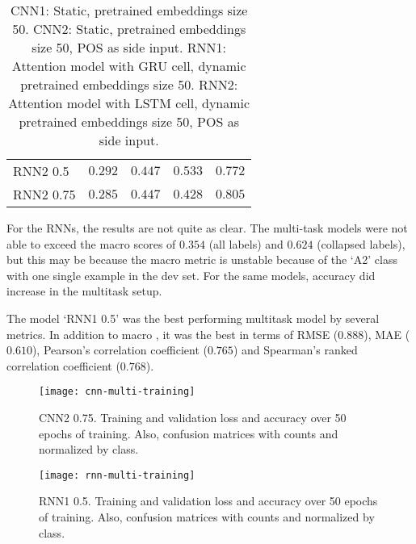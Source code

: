 \begin{table}
\begin{tabular}{lrrrr}
    RNN2 0.5  &         $0.292$  &         $0.447$  &         $0.533$  &         $0.772$  \\
    RNN2 0.75 &         $0.285$  &         $0.447$  &         $0.428$  &         $0.805$  \\
    \bottomrule
  \end{tabular}
  \caption{CNN1: Static, pretrained embeddings size 50.
           CNN2: Static, pretrained embeddings size 50, POS as side input.
           RNN1: Attention model with GRU cell, dynamic pretrained
           embeddings size 50.
           RNN2: Attention model with LSTM cell, dynamic pretrained
           embeddings size 50, POS as side input.}
  \label{tab:multitask-results}
\end{table}

For the RNNs, the results are not quite as clear. The multi-task models were
not able to exceed the macro \FI scores of $0.354$ (all labels) and $0.624$
(collapsed labels), but this may be because the macro \FI metric is unstable
because of the `A2' class with one single example in the dev set. For the
same models, accuracy did increase in the multitask setup.

The model `RNN1 0.5' was the best performing multitask model by several
metrics. In addition to macro \FI, it was the best in terms of RMSE
($0.888$), MAE ($0.610$), Pearson's correlation coefficient ($0.765$) and
Spearman's ranked correlation coefficient ($0.768$).


\begin{figure}
  \centering
  \texttt{[image: cnn-multi-training]}
  \caption{CNN2 0.75. Training and validation loss and accuracy over 50 epochs of training.
           Also, confusion matrices with counts and normalized by class.}
  \label{fig:cnn-multi-training}
\end{figure}


\begin{figure}
  \centering
  \texttt{[image: rnn-multi-training]}
  \caption{RNN1 0.5. Training and validation loss and accuracy over 50 epochs of training.
           Also, confusion matrices with counts and normalized by class.}
  \label{fig:rnn-multi-training}
\end{figure}
